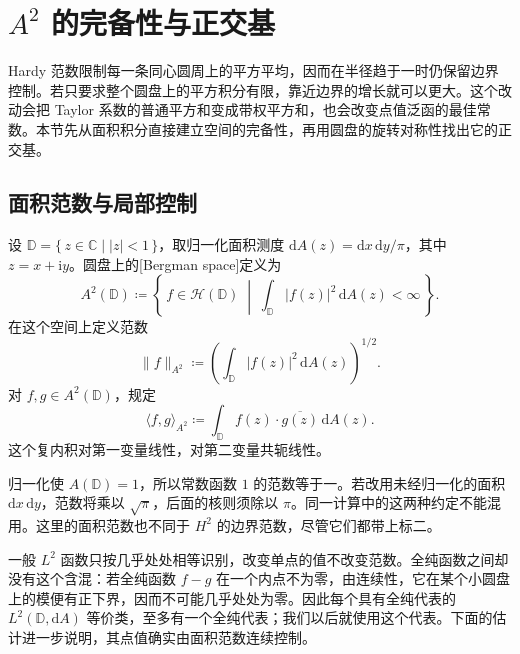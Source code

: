 \section{\texorpdfstring{\(A^2\)}{A²} 的完备性与正交基}
\label{b3:sec:2804}
Hardy 范数限制每一条同心圆周上的平方平均，因而在半径趋于一时仍保留边界控制。若只要求整个圆盘上的平方积分有限，靠近边界的增长就可以更大。这个改动会把 Taylor 系数的普通平方和变成带权平方和，也会改变点值泛函的最佳常数。本节先从面积积分直接建立空间的完备性，再用圆盘的旋转对称性找出它的正交基。

\subsection{面积范数与局部控制}
\label{b3:subsec:280401}

\begin{definition}[圆盘 Bergman 空间]\label{b3:def:28-bergman-space}
设 \(\mathbb D=\{\,z\in\mathbb C\mid |z|<1\,\}\)，取归一化面积测度 \(\mathrm{d}A(z)=\mathrm{d}x\,\mathrm{d}y/\pi\)，其中 \(z=x+\mathrm{i}y\)。圆盘上的[Bergman space]定义为
\[
 A^2(\mathbb D)\coloneqq
 \left\{\,f\in\mathcal H(\mathbb D)
 \;\middle|\;\int_{\mathbb D}|f(z)|^2\,\mathrm{d}A(z)<\infty\,\right\}.
\]
在这个空间上定义范数
\[
 \|f\|_{A^2}\coloneqq
 \left(\int_{\mathbb D}|f(z)|^2\,\mathrm{d}A(z)\right)^{1/2}.
\]
对 \(f,g\in A^2(\mathbb D)\)，规定
\[
 \langle f,g\rangle_{A^2}
 \coloneqq\int_{\mathbb D}f(z)\cdot\overline{g(z)}\,\mathrm{d}A(z).
\]
这个复内积对第一变量线性，对第二变量共轭线性。
\end{definition}

归一化使 \(A(\mathbb D)=1\)，所以常数函数 \(1\) 的范数等于一。若改用未经归一化的面积 \(\mathrm{d}x\,\mathrm{d}y\)，范数将乘以 \(\sqrt\pi\)，后面的核则须除以 \(\pi\)。同一计算中的这两种约定不能混用。这里的面积范数也不同于 \(H^2\) 的边界范数，尽管它们都带上标二。

\ProseParagraphBreak

一般 \(L^2\) 函数只按几乎处处相等识别，改变单点的值不改变范数。全纯函数之间却没有这个含混：若全纯函数 \(f-g\) 在一个内点不为零，由连续性，它在某个小圆盘上的模便有正下界，因而不可能几乎处处为零。因此每个具有全纯代表的 \(L^2(\mathbb D,\mathrm{d}A)\) 等价类，至多有一个全纯代表；我们以后就使用这个代表。下面的估计进一步说明，其点值确实由面积范数连续控制。

